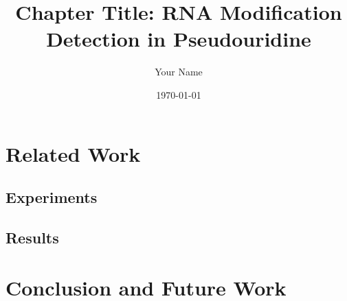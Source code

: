 \documentclass[12pt]{book}
\begin{document}
  \title{Chapter Title: RNA Modification Detection in Pseudouridine}
  \author{Your Name}
  \date{\today}

  \maketitle

  \tableofcontents
  \newpage


  
  


  \chapter{Related Work}
    \label{ch:related}


    \section{Experiments}
      \label{sec:experiments}


    \section{Results}
      \label{sec:results}


  \chapter{Conclusion and Future Work}
    \label{ch:conclusion}

    
\end{document}

